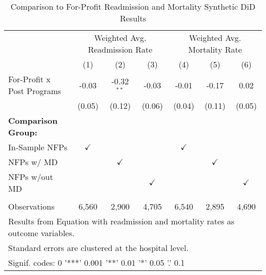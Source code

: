 \begin{table}[ht!]

\caption{\label{tab:forprofit_readmort_synth}Comparison to For-Profit Readmission and Mortality Synthetic DiD Results}
\centering
\begin{tabular}[t]{lcccccc}
\toprule
\multicolumn{1}{c}{ } & \multicolumn{3}{c}{Weighted Avg. Readmission Rate} & \multicolumn{3}{c}{Weighted Avg. Mortality Rate} \\
 & (1) & (2) & (3) & (4) & (5) & (6)\\
\midrule
For-Profit x Post Programs & -0.03 & -0.32$^{**}$ & -0.03 & -0.01 & -0.17 & 0.02\\
 & (0.05) & (0.12) & (0.06) & (0.04) & (0.11) & (0.05)\\
\textbf{Comparison Group:} &  &  &  &  &  & \\
In-Sample NFPs & $\checkmark$ &  &  & $\checkmark$ &  & \\
NFPs w/ MD &  & $\checkmark$ &  &  & $\checkmark$ & \\
\addlinespace
NFPs w/out MD &  &  & $\checkmark$ &  &  & $\checkmark$\\
 &  &  &  &  &  & \\
Observations & 6,560 & 2,900 & 4,705 & 6,540 & 2,895 & 4,690\\
\bottomrule
\multicolumn{7}{l}{\textsuperscript{} Results from Equation with readmission and mortality rates as outcome variables.}\\
\multicolumn{7}{l}{\textsuperscript{} Standard errors are clustered at the hospital level.}\\
\multicolumn{7}{l}{\textsuperscript{} Signif. codes: 0 '***' 0.001 '**' 0.01 '*' 0.05 '.' 0.1}\\
\end{tabular}
\end{table}
